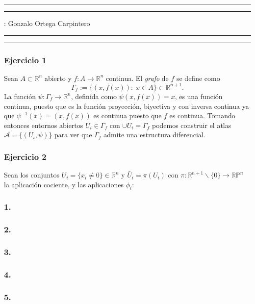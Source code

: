 \documentclass[11pt,a4paper]{article}
\begin{document}
\hrule\hrule
\vspace{1mm}


\vspace{1mm}

 : Gonzalo Ortega Carpintero
\vspace{2mm}

\hrule\hrule

\subsubsection*{\bf Ejercicio 1}
Sean $ A \subset \mathbb R^n $ abierto y $ f: A \rightarrow \mathbb R^n $ continua. El {\it grafo} de $ f $ se define como
$$
  \Gamma_f := \{(x, f(x)): \; x \in A\} \subset \mathbb R^{n+1}. 
$$
La función $ \psi: \Gamma_f \rightarrow \mathbb R^n $, definida como $ \psi(x, f(x)) = x $, es una función continua, puesto que es la función proyección, biyectiva y con inversa continua ya que $ \psi^{-1}(x) = (x, f(x)) $ es continua puesto que $ f $ es continua. Tomando entonces entornos abiertos $ U_i \in \Gamma_f $ con $ \cup U_i = \Gamma_f $ podemos construir el atlas $ \mathcal A = \{ (U_i, \psi) \} $ para ver que $ \Gamma_f $ admite una estructura diferencial.

\subsubsection*{\bf Ejercicio 2}
Sean los conjuntos $ U_i = \{x_i \neq 0\} \in \mathbb R^n $ y $ \bar U_i = \pi(U_i) $ con $ \pi: \mathbb R^{n+1}\backslash \{0\} \rightarrow \mathbb{RP}^n $ la aplicación cociente, y las aplicaciones $ \phi_i :$
\subsubsection*{\bf 1.}
\subsubsection*{\bf 2.}
\subsubsection*{\bf 3.}
\subsubsection*{\bf 4.}
\subsubsection*{\bf 5.}
\end{document}
